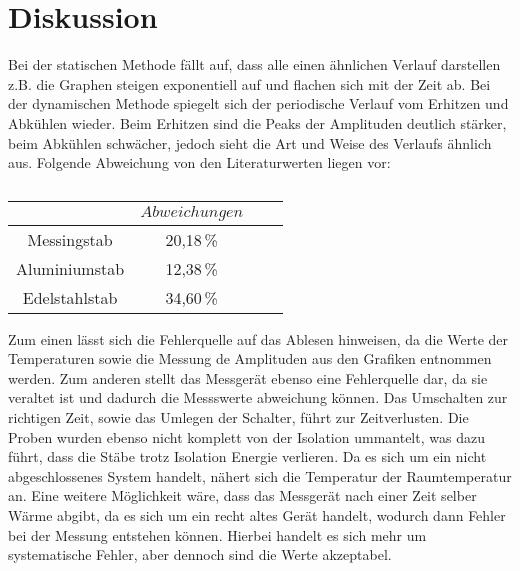 \section{Diskussion}

\begin{flushleft}
    Bei der statischen Methode fällt auf, dass alle einen ähnlichen Verlauf darstellen z.B. die Graphen steigen exponentiell auf und flachen sich mit der Zeit ab. 
    Bei der dynamischen Methode spiegelt sich der periodische Verlauf vom Erhitzen und Abkühlen wieder. 
    Beim Erhitzen sind die Peaks der Amplituden deutlich stärker, beim Abkühlen schwächer, jedoch sieht die Art und Weise des Verlaufs ähnlich aus.
    Folgende Abweichung von den Literaturwerten \cite{a7} \cite{a2} \cite{a6} \cite{a4} \cite{a3} \cite{a5} liegen vor:
\end{flushleft}

\begin{table}
    \centering
    \caption{}
    \label{Tabelle}
    \begin{tabular} {c  c  c  c}
        \toprule
        {$ $} &
        {$ Abweichungen $} \\
        \midrule
        Messingstab   & 20,18\,\% \\
        Aluminiumstab & 12,38\,\% \\
        Edelstahlstab & 34,60\,\% \\
        \bottomrule
    \end{tabular}  
\end{table}

\begin{flushleft}
    Zum einen lässt sich die Fehlerquelle auf das Ablesen hinweisen, da die Werte der Temperaturen sowie die Messung de Amplituden aus den Grafiken entnommen werden.
    Zum anderen stellt das Messgerät ebenso eine Fehlerquelle dar, da sie veraltet ist und dadurch die Messswerte abweichung können. 
    Das Umschalten zur richtigen Zeit, sowie das Umlegen der Schalter, führt zur Zeitverlusten.
    Die Proben wurden ebenso nicht komplett von der Isolation ummantelt, was dazu führt, dass die Stäbe trotz Isolation Energie verlieren.
    Da es sich um ein nicht abgeschlossenes System handelt, nähert sich die Temperatur der Raumtemperatur an.
    Eine weitere Möglichkeit wäre, dass das Messgerät nach einer Zeit selber Wärme abgibt, da es sich um ein recht altes Gerät handelt, wodurch dann Fehler bei der Messung entstehen können.
    Hierbei handelt es sich mehr um systematische Fehler, aber dennoch sind die Werte akzeptabel.
\end{flushleft}